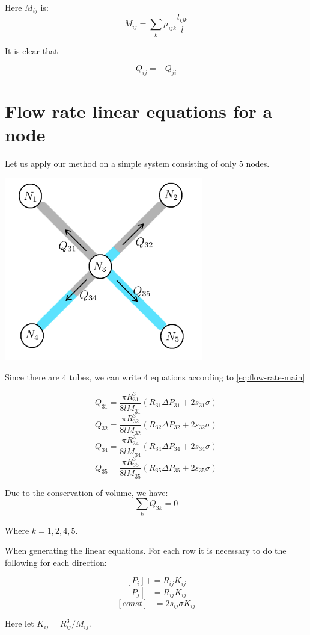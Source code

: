 	Here $M_{ij}$ is:
	\[ {M}_{ij} = \sum_{k} {\mu}_{ijk} \frac{l_{ijk}}{l} \]
	 
	It is clear that

	\begin{equation}
		Q_{ij} = -Q_{ji}
	\end{equation}


\section{Flow rate linear equations for a node} \label{sec:linear-equ}

	Let us apply our method on a simple system consisting of only 5 nodes.

	\includegraphics[height=8cm]{figures/fig_simple-5-nodes}

	Since there are 4 tubes, we can write 4 equations according to \ref{eq:flow-rate-main}
	
	\[ Q_{31} = \frac{\pi R_{31}^3}{8lM_{31}}(R_{31}\Delta P_{31} + 2s_{31}\sigma) \]
	\[ Q_{32} = \frac{\pi R_{32}^3}{8lM_{32}}(R_{32}\Delta P_{32} + 2s_{32}\sigma) \]
	\[ Q_{34} = \frac{\pi R_{34}^3}{8lM_{34}}(R_{34}\Delta P_{34} + 2s_{34}\sigma) \]
	\[ Q_{35} = \frac{\pi R_{35}^3}{8lM_{35}}(R_{35}\Delta P_{35} + 2s_{35}\sigma) \]

	Due to the conservation of volume, we have:
	\[ \sum_{k} Q_{3k} = 0 \]
	
	Where $k = {1, 2, 4, 5}$.
	
	When generating the linear equations. For each row it is necessary to do the following for each direction:
	
	\[ [P_i] += R_{ij}K_{ij} \]
	\[ [P_j] -= R_{ij}K_{ij} \]
	\[ [const] -= 2s_{ij}\sigma K_{ij} \]
	
	Here let $K_{ij} = R^3_{ij}/{M}_{ij}$.

